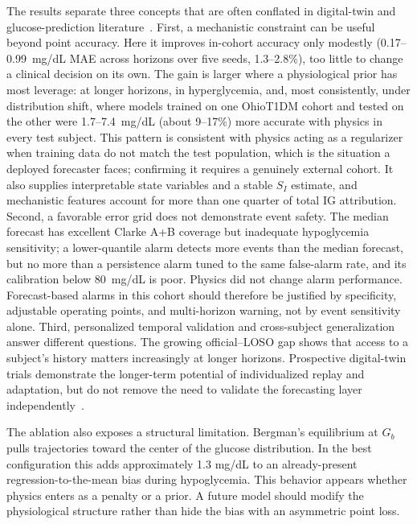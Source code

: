 \documentclass[journal]{IEEEtran}
\begin{document}
The results separate three concepts that are often conflated in digital-twin and glucose-prediction literature~\cite{ref2}. First, a mechanistic constraint can be useful beyond point accuracy. Here it improves in-cohort accuracy only modestly (0.17--0.99~mg/dL MAE across horizons over five seeds, 1.3--2.8\%), too little to change a clinical decision on its own. The gain is larger where a physiological prior has most leverage: at longer horizons, in hyperglycemia, and, most consistently, under distribution shift, where models trained on one OhioT1DM cohort and tested on the other were 1.7--7.4~mg/dL (about 9--17\%) more accurate with physics in every test subject. This pattern is consistent with physics acting as a regularizer when training data do not match the test population, which is the situation a deployed forecaster faces; confirming it requires a genuinely external cohort. It also supplies interpretable state variables and a stable $S_I$ estimate, and mechanistic features account for more than one quarter of total IG attribution. Second, a favorable error grid does not demonstrate event safety. The median forecast has excellent Clarke A+B coverage but inadequate hypoglycemia sensitivity; a lower-quantile alarm detects more events than the median forecast, but no more than a persistence alarm tuned to the same false-alarm rate, and its calibration below 80~mg/dL is poor. Physics did not change alarm performance. Forecast-based alarms in this cohort should therefore be justified by specificity, adjustable operating points, and multi-horizon warning, not by event sensitivity alone. Third, personalized temporal validation and cross-subject generalization answer different questions. The growing official--LOSO gap shows that access to a subject's history matters increasingly at longer horizons. Prospective digital-twin trials demonstrate the longer-term potential of individualized replay and adaptation, but do not remove the need to validate the forecasting layer independently~\cite{ref18}.

The ablation also exposes a structural limitation. Bergman's equilibrium at $G_b$ pulls trajectories toward the center of the glucose distribution. In the best configuration this adds approximately 1.3 mg/dL to an already-present regression-to-the-mean bias during hypoglycemia. This behavior appears whether physics enters as a penalty or a prior. A future model should modify the physiological structure rather than hide the bias with an asymmetric point loss.

\end{document}
